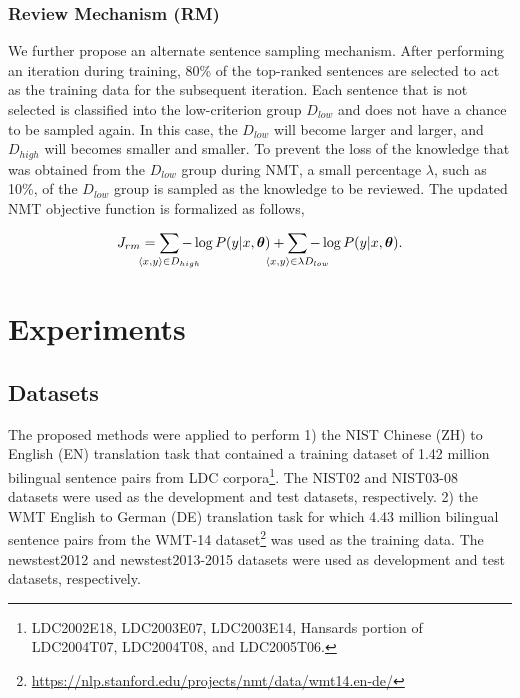 \documentclass[11pt,a4paper]{article}
\begin{document}
\subsubsection{Review Mechanism (RM)}
\label{sec:rm}


We further propose an alternate sentence sampling mechanism. After performing an iteration during training, 80\% of the top-ranked  sentences are selected to act as the training data for the subsequent iteration. Each sentence that is not selected is classified into the low-criterion group $D_{low}$ and does not have a chance to be sampled again. In this case, the $D_{low}$ will become larger and larger, and $D_{high}$ will becomes smaller and smaller. To prevent the loss of the knowledge that  was obtained from the $D_{low}$ group during NMT, a small percentage $\lambda$, such as 10\%, of the  $D_{low}$ group is sampled as the knowledge to be reviewed. The updated NMT objective function is formalized as follows,

{\footnotesize 
	\begin{equation}
		\label{eq:rm}
		\begin{aligned}
			J_{rm} = \sum_{\mathclap{\langle x, y\rangle \in D_{high}}} -\log P(y|x, \bm{\theta}) + \sum_{\mathclap{\langle x, y\rangle \in \lambda  D_{low}}} - \log P(y|x, \bm{\theta}).
		\end{aligned}
	\end{equation}}






\section{Experiments}
\label{sec:ex}



\subsection{Datasets}

The proposed methods were applied to perform 1) the NIST Chinese (ZH) to English (EN) translation task that contained a training dataset of 1.42 million bilingual sentence pairs from LDC corpora\footnote{LDC2002E18, LDC2003E07, LDC2003E14, Hansards portion of LDC2004T07, LDC2004T08, and LDC2005T06.}. The NIST02 and NIST03-08 datasets were used as the development and test datasets, respectively. 2) the WMT  English to German (DE) translation task for which 4.43 million bilingual sentence pairs from the WMT-14 dataset\footnote{\url{https://nlp.stanford.edu/projects/nmt/data/wmt14.en-de/}}  was used as the training data. The newstest2012 and newstest2013-2015 datasets were used as development and test datasets, respectively.
\end{document}
